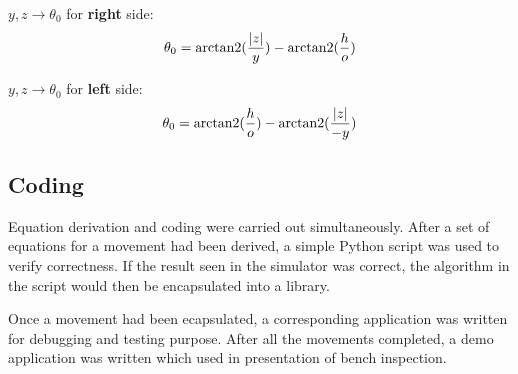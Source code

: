 $y, z \rightarrow \theta_0$ for \textbf{right} side:
\begin{equation}
   \theta_0 = \operatorname{arctan2}(\frac{\lvert z \lvert}{y}) - \operatorname{arctan2}(\frac{h}{o})
\end{equation}

$y, z \rightarrow \theta_0$ for \textbf{left} side:
\begin{equation}
   \theta_0 = \operatorname{arctan2}(\frac{h}{o}) - \operatorname{arctan2}(\frac{\lvert z \lvert}{-y})
\end{equation}

\subsection{Coding}

Equation derivation and coding were carried out simultaneously. After a set of equations for a movement had been derived, a simple Python script was used to verify correctness. If the result seen in the simulator was correct, the algorithm in the script would then be encapsulated into a library.

Once a movement had been ecapsulated, a corresponding application was written for debugging and testing purpose. After all the movements completed, a demo application was written which used in presentation of bench inspection.
